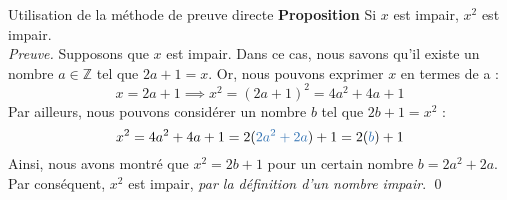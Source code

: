 \documentclass[16pt]{report}
\begin{document}
\begin{multicols*}{2}
            \begin{center}
            \noindent{}
            \end{center}
            

            \begin{Preuve}{Utilisation de la méthode de preuve directe}{}
                   \textbf{Proposition} \quad Si $x$ est impair, $x^2$ est impair. 
                    \vspace{1em}\\ %
                   \textit{Preuve.} \quad Supposons que $x$ est impair. Dans ce cas, nous savons qu'il existe un 
                   nombre $a \in \mathbb{Z}$ tel que $2a + 1 = x$. Or, nous pouvons exprimer $x$ en termes de 
                   a : 
                   \[ x = 2a + 1 \implies  x^2 = (2a + 1)^2 = 4a^2 + 4a + 1\]
                   Par ailleurs, nous pouvons considérer un nombre $b$ tel que $2b + 1 = x^2$ : 
                   \[ x^2 = 4a^2 + 4a +1 = 2(\textcolor{myb}{2a^2 + 2a}) + 1 = 2(\textcolor{myb}{b}) + 1 \]
                   Ainsi, nous avons montré que $x^2 = 2b + 1$ pour un certain nombre $b = 2a^2 +2a$. 
                   Par conséquent, $x^2$ est impair, \textit{par la définition d'un nombre impair}. \qed
            \end{Preuve}



\end{multicols*}
\end{document}
